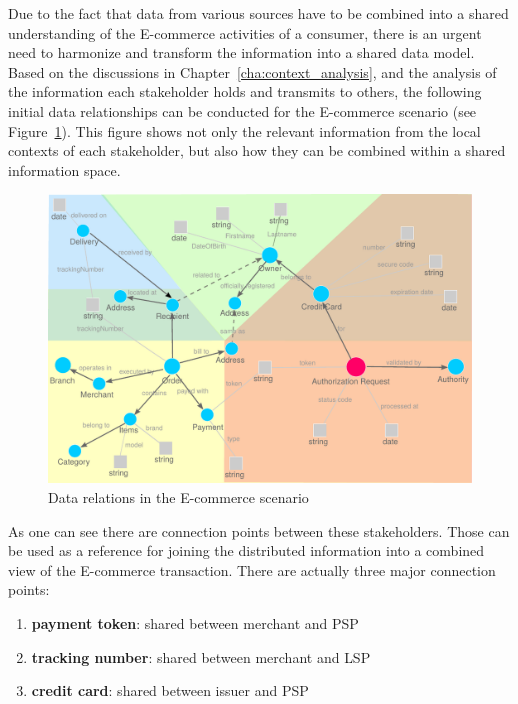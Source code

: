 Due to the fact that data from various sources have to be combined into a shared understanding of the \gls{E-commerce} activities of a consumer, there is an urgent need to harmonize and transform the information into a shared data model. Based on the discussions in Chapter~\ref{cha:context_analysis}, and the analysis of the information each stakeholder holds and transmits to others, the following initial data relationships can be conducted for the \gls{E-commerce} scenario (see Figure~\ref{fig:images_data_model}). This figure shows not only the relevant information from the local contexts of each stakeholder, but also how they can be combined within a shared information space. \\

\begin{figure}[!ht]
  \centering
  \includegraphics[width=0.9\columnwidth]{images/ontology_scenario_1.pdf}
  \caption[Data relations in the E-commerce scenario]{Data relations in the \gls{E-commerce} scenario\protect\footnotemark}
\label{fig:images_data_model}
\end{figure}

As one can see there are connection points between these stakeholders. Those can be used as a reference for joining the distributed information into a combined view of the \gls{E-commerce} transaction. There are actually three major connection points: \@

\begin{enumerate}
  \item \textbf{payment token}: shared between merchant and \gls{PSP}
  \item \textbf{tracking number}: shared between merchant and \gls{LSP}
  \item \textbf{credit card}: shared between issuer and \gls{PSP}
\end{enumerate}

